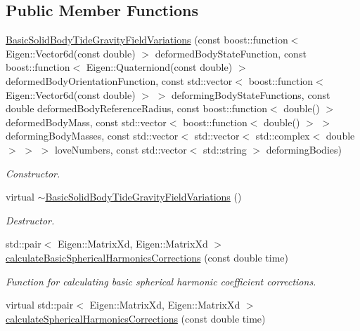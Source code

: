 \subsection*{Public Member Functions}
\begin{DoxyCompactItemize}
\item 
\hyperlink{classtudat_1_1gravitation_1_1BasicSolidBodyTideGravityFieldVariations_a698be5ee244e5444650db403b653102c}{Basic\+Solid\+Body\+Tide\+Gravity\+Field\+Variations} (const boost\+::function$<$ Eigen\+::\+Vector6d(const double) $>$ deformed\+Body\+State\+Function, const boost\+::function$<$ Eigen\+::\+Quaterniond(const double) $>$ deformed\+Body\+Orientation\+Function, const std\+::vector$<$ boost\+::function$<$ Eigen\+::\+Vector6d(const double) $>$ $>$ deforming\+Body\+State\+Functions, const double deformed\+Body\+Reference\+Radius, const boost\+::function$<$ double() $>$ deformed\+Body\+Mass, const std\+::vector$<$ boost\+::function$<$ double() $>$ $>$ deforming\+Body\+Masses, const std\+::vector$<$ std\+::vector$<$ std\+::complex$<$ double $>$ $>$ $>$ love\+Numbers, const std\+::vector$<$ std\+::string $>$ deforming\+Bodies)
\begin{DoxyCompactList}\small\item\em Constructor. \end{DoxyCompactList}\item 
virtual \hyperlink{classtudat_1_1gravitation_1_1BasicSolidBodyTideGravityFieldVariations_a724a92f0468e38cee6359323d7fafa8b}{$\sim$\+Basic\+Solid\+Body\+Tide\+Gravity\+Field\+Variations} ()
\begin{DoxyCompactList}\small\item\em Destructor. \end{DoxyCompactList}\item 
std\+::pair$<$ Eigen\+::\+Matrix\+Xd, Eigen\+::\+Matrix\+Xd $>$ \hyperlink{classtudat_1_1gravitation_1_1BasicSolidBodyTideGravityFieldVariations_a531dcae6f842ada23679d1151df4d5c4}{calculate\+Basic\+Spherical\+Harmonics\+Corrections} (const double time)
\begin{DoxyCompactList}\small\item\em Function for calculating basic spherical harmonic coefficient corrections. \end{DoxyCompactList}\item 
virtual std\+::pair$<$ Eigen\+::\+Matrix\+Xd, Eigen\+::\+Matrix\+Xd $>$ \hyperlink{classtudat_1_1gravitation_1_1BasicSolidBodyTideGravityFieldVariations_ad944298a2aaa69b32adcbb1243e99905}{calculate\+Spherical\+Harmonics\+Corrections} (const double time)

\end{DoxyCompactItemize}
